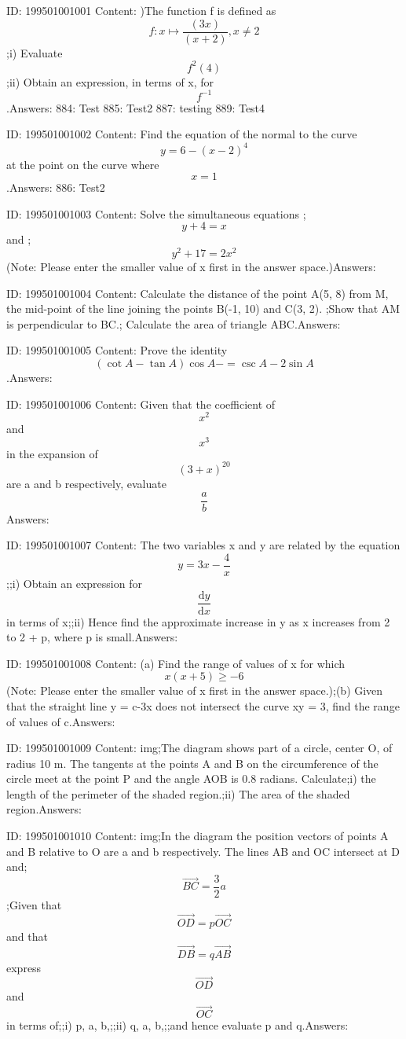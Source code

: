 \documentclass{article}
\begin{document}
ID: 199501001001
Content:
)The function f is defined as \[f:x \mapsto \frac{\left (3x  \right )}{\left ( x+2 \right )},x\neq 2 \];i) Evaluate \[f^{2}\left ( 4 \right )\];ii) Obtain an expression, in terms of x, for \[f^{-1}\].Answers:
884: Test
885: Test2
887: testing
889: Test4

ID: 199501001002
Content:
Find the equation of the normal to the curve \[y=6-(x-2)^4\] at the point on the curve where \[x=1\].Answers:
886: Test2

ID: 199501001003
Content:
Solve the simultaneous equations ;\[y+4 = x\] and ;\[y^2+17 = 2x^{2}\] (Note: Please enter the smaller value of x first in the answer space.)Answers:

ID: 199501001004
Content:
Calculate the distance of the point A(5, 8) from M, the mid-point of the line joining the points B(-1, 10) and C(3, 2). ;Show that AM is perpendicular to BC.; Calculate the area of triangle ABC.Answers:

ID: 199501001005
Content:
Prove the identity \[\left ( \cot A - \tan A \right )\cos A -=\csc A - 2\sin A\].Answers:

ID: 199501001006
Content:
Given that the coefficient of \[x^{2}\] and \[x^{3}\] in the expansion of \[\left ( 3+x \right )^{20}\] are a and b respectively, evaluate \[\frac{a}{b}\]Answers:

ID: 199501001007
Content:
The two variables x and y are related by the equation \[y = 3x - \frac{4}{x}\];;i) Obtain an expression for \[\frac{\mathrm{d} y}{\mathrm{d} x}\] in terms of x;;ii) Hence find the approximate increase in y as x increases from 2 to 2 + p, where p is small.Answers:

ID: 199501001008
Content:
(a)	Find the range of values of x for which \[x\left ( x+5 \right )\geqslant -6\] (Note: Please enter the smaller value of x first in the answer space.);(b) Given that the straight line y = c-3x  does not intersect the curve xy = 3, find the range of values of c.Answers:

ID: 199501001009
Content:
img;The diagram shows part of a circle, center O, of radius 10 m. The tangents at the points A and B on the circumference of the circle meet at the point P and the angle AOB is 0.8 radians. Calculate;i)	the length of the perimeter of the shaded region.;ii)	The area of the shaded region.Answers:

ID: 199501001010
Content:
img;In the diagram the position vectors of points A and B relative to O are a and b respectively. The lines AB and OC intersect at D and;\[ \vec{BC} = \frac{3}{2} a\] ;Given that \[\vec{OD} = p\vec{OC}\] and that \[\vec{DB} = q\vec{AB}\] express \[\vec{OD}\]  and  \[\vec{OC}\] in terms of;;i) p, a, b,;;ii) q, a, b,;;and hence evaluate p and q.Answers:
\end{document}
